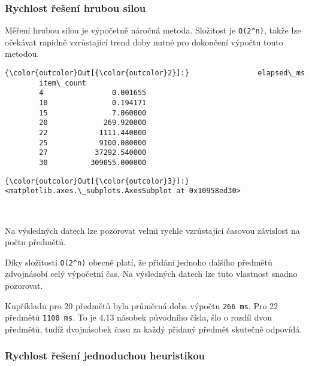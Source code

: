 \documentclass[11pt]{article}
\begin{document}
    \subsubsection{Rychlost řešení hrubou
silou}\label{rychlost-ux159eux161enuxed-hrubou-silou}

Měření hrubou silou je výpočetně náročná metoda. Složitost je
\texttt{O(2\^{}n)}, takže lze očekávat rapidně vzrůstající trend doby
nutné pro dokončení výpočtu touto metodou.


\begin{Verbatim}[commandchars=\\\{\}]
{\color{outcolor}Out[{\color{outcolor}2}]:}                elapsed\_ms
        item\_count               
        4                0.001655
        10               0.194171
        15               7.060000
        20             269.920000
        22            1111.440000
        25            9100.080000
        27           37292.540000
        30          309055.000000
\end{Verbatim}
            
\begin{Verbatim}[commandchars=\\\{\}]
{\color{outcolor}Out[{\color{outcolor}3}]:} <matplotlib.axes.\_subplots.AxesSubplot at 0x10958ed30>
\end{Verbatim}
            
    \begin{center}
    \end{center}
    { \hspace*{\fill} \\}
    
    Na výsledných datech lze pozorovat velmi rychle vzrůstající časovou
závislost na počtu předmětů.

Díky složitosti \texttt{O(2\^{}n)} obecně platí, že přidání jednoho
dalšího předmětů zdvojnásobí celý výpočetní čas. Na výsledných datech
lze tuto vlastnost snadno pozorovat.

Kupříkladu pro 20 předmětů byla průměrná doba výpočtu \texttt{266\ ms}.
Pro 22 předmětů \texttt{1100\ ms}. To je 4.13 násobek původního čísla,
šlo o rozdíl dvou předmětů, tudíž dvojnásobek času za každý přidaný
předmět skutečně odpovídá.

    \subsubsection{Rychlost řešení jednoduchou
heuristikou}\label{rychlost-ux159eux161enuxed-jednoduchou-heuristikou}
\end{document}
